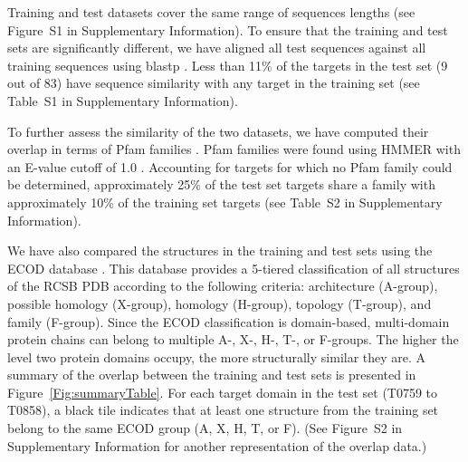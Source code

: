 \documentclass{bioinfo}
\begin{document}
%
Training and test datasets cover the same range of sequences
lengths (see Figure~S1 in Supplementary Information). To ensure that the
training and test sets are significantly different, we have aligned
all test sequences against all training sequences using
blastp \citep{altschul1990basic}.  Less than 11\% of the targets in the
test set (9 out of 83) have sequence similarity with any target in the
training set (see Table~S1 in Supplementary Information).

To further assess the similarity of the two datasets, we have computed
their overlap in terms of Pfam families \citep{finn2016pfam}. Pfam
families were found using HMMER \citep{finn2015hmmer} with an E-value
cutoff of 1.0 \citep{finn2016pfam}.  Accounting for targets for which
no Pfam family could be determined, approximately 25\% of the test set
targets share a family with approximately 10\% of the training set
targets (see Table~S2 in Supplementary Information).

We have also compared the structures in the training and test sets
using the ECOD database \citep{cheng2014ecod}. This database provides a
5-tiered classification of all structures of the RCSB PDB
\citep{berman2000protein} according to the following criteria:
architecture (A-group), possible homology (X-group), homology
(H-group), topology (T-group), and family (F-group).  Since the ECOD
classification is domain-based, multi-domain protein chains can belong
to multiple A-, X-, H-, T-, or F-groups.  The higher the level two
protein domains occupy, the more structurally similar they are.
%
A summary of the overlap between the training and test sets is
presented in Figure~\ref{Fig:summaryTable}. For each target domain in
the test set (T0759 to T0858), a black tile indicates that at least
one structure from the training set belong to the same ECOD group (A,
X, H, T, or F). (See Figure~S2 in Supplementary Information for another
representation of the overlap data.)
%
%
\end{document}
